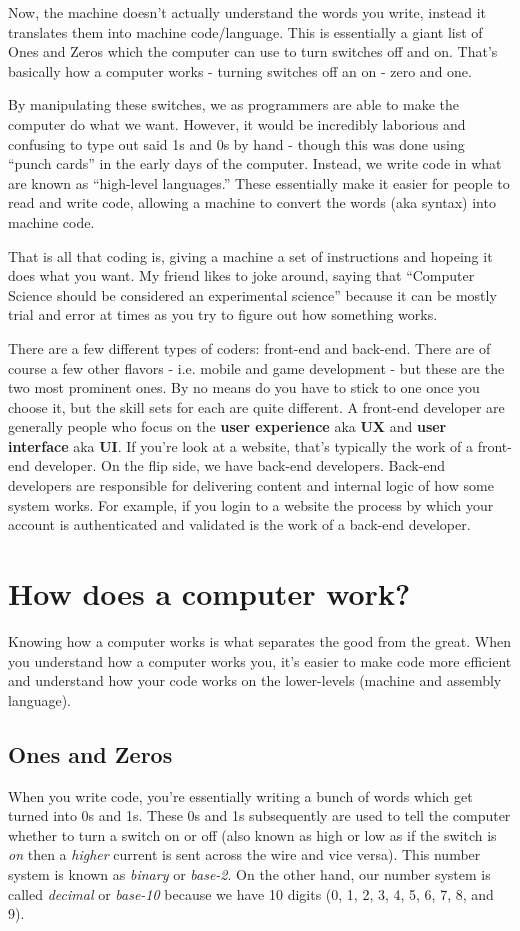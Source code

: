 \documentclass[12pt,a4paper]{book}
\begin{document}
		Now, the machine doesn't actually understand the words you write, instead it translates them into machine code/language. This is essentially a giant list of Ones and Zeros which the computer can use to turn switches off and on. That's basically how a computer works - turning switches off an on - zero and one.
		
		By manipulating these switches, we as programmers are able to make the computer do what we want. However, it would be incredibly laborious and confusing to type out said 1s and 0s by hand - though this was done using ``punch cards'' in the early days of the computer. Instead, we write code in what are known as ``high-level languages.'' These essentially make it easier for people to read and write code, allowing a machine to convert the words (aka syntax) into machine code.
		
		That is all that coding is, giving a machine a set of instructions and hopeing it does what you want. My friend likes to joke around, saying that ``Computer Science should be considered an experimental science'' because it can be mostly trial and error at times as you try to figure out how something works. 
		
		There are a few different types of coders: front-end and back-end. There are of course a few other flavors - i.e. mobile and game development - but these are the two most prominent ones. By no means do you have to stick to one once you choose it, but the skill sets for each are quite different. A front-end developer are generally people who focus on the \textbf{user experience} aka \textbf{UX} and \textbf{user interface} aka \textbf{UI}. If you're look at a website, that's typically the work of a front-end developer. On the flip side, we have back-end developers. Back-end developers are responsible for delivering content and internal logic of how some system works. For example, if you login to a website the process by which your account is authenticated and validated is the work of a back-end developer.

	\chapter{How does a computer work?}  \label{chap:computers}
		Knowing how a computer works is what separates the good from the great. When you understand how a computer works you, it's easier to make code more efficient and understand how your code works on the lower-levels (machine and assembly language).
		\section{Ones and Zeros} \label{sec:computers-binary}
			When you write code, you're essentially writing a bunch of words which get turned into 0s and 1s. These 0s and 1s subsequently are used to tell the computer whether to turn a switch on or off (also known as high or low as if the switch is \textit{on} then a \textit{higher} current is sent across the wire and vice versa). This number system is known as \textit{binary} or \textit{base-2}. On the other hand, our number system is called \textit{decimal} or \textit{base-10} because we have 10 digits (0, 1, 2, 3, 4, 5, 6, 7, 8, and 9).
\end{document}
